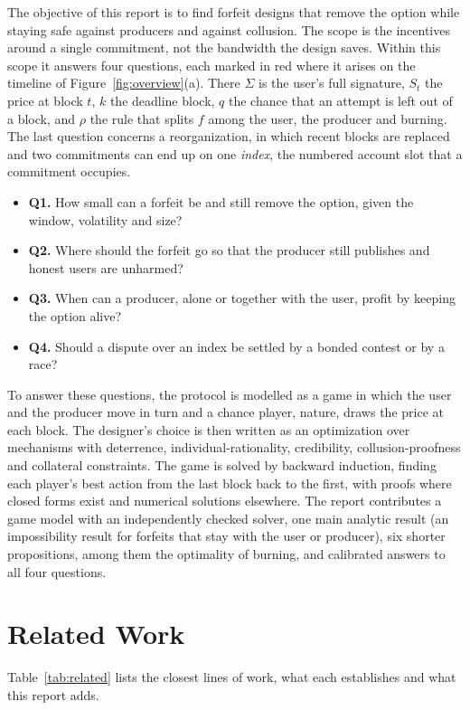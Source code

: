 \documentclass[11pt]{article}
\begin{document}
The objective of this report is to find forfeit designs that remove the option while staying safe against producers and against collusion. The scope is the incentives around a single commitment, not the bandwidth the design saves. Within this scope it answers four questions, each marked in red where it arises on the timeline of Figure~\ref{fig:overview}(a). There $\Sigma$ is the user's full signature, $S_t$ the price at block $t$, $k$ the deadline block, $q$ the chance that an attempt is left out of a block, and $\rho$ the rule that splits $f$ among the user, the producer and burning. The last question concerns a reorganization, in which recent blocks are replaced and two commitments can end up on one \emph{index}, the numbered account slot that a commitment occupies.
\begin{itemize}\setlength{\itemsep}{0pt}
\item \textbf{Q1.} How small can a forfeit be and still remove the option, given the window, volatility and size?
\item \textbf{Q2.} Where should the forfeit go so that the producer still publishes and honest users are unharmed?
\item \textbf{Q3.} When can a producer, alone or together with the user, profit by keeping the option alive?
\item \textbf{Q4.} Should a dispute over an index be settled by a bonded contest or by a race?
\end{itemize}

To answer these questions, the protocol is modelled as a game in which the user and the producer move in turn and a chance player, nature, draws the price at each block. The designer's choice is then written as an optimization over mechanisms with deterrence, individual-rationality, credibility, collusion-proofness and collateral constraints. The game is solved by backward induction, finding each player's best action from the last block back to the first, with proofs where closed forms exist and numerical solutions elsewhere. The report contributes a game model with an independently checked solver, one main analytic result (an impossibility result for forfeits that stay with the user or producer), six shorter propositions, among them the optimality of burning, and calibrated answers to all four questions.

\section{Related Work}\label{sec:related}
Table~\ref{tab:related} lists the closest lines of work, what each establishes and what this report adds.
\end{document}
